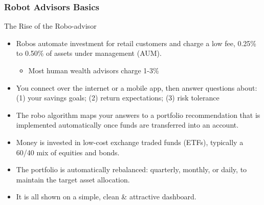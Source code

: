\documentclass[aspectratio=169]{beamer}
\begin{document}
\begin{frame}
\frametitle{Robot Advisors Basics}


\vspace{-2mm}
The Rise of the Robo-advisor
\begin{itemize}
  \item Robos automate investment for retail customers and charge a low fee, 0.25\% to 0.50\% of assets under management (AUM).
  \begin{itemize}
      \item Most human wealth advisors charge 1-3\% 
  \end{itemize}

  \item You connect over the internet or a mobile app, then answer questions about: (1) your savings goals; (2) return expectations; (3) risk tolerance

  \item The robo algorithm maps your answers to a portfolio recommendation that is implemented automatically once funds are transferred into an account.

  \item Money is invested in low-cost exchange traded funds (ETFs), typically a 60/40 mix of equities and bonds.

  \item The portfolio is automatically rebalanced: quarterly, monthly, or daily, to maintain the target asset allocation.
  

  \item It is all shown on a simple, clean \& attractive dashboard.

\end{itemize}



\end{frame} 
\end{document}
